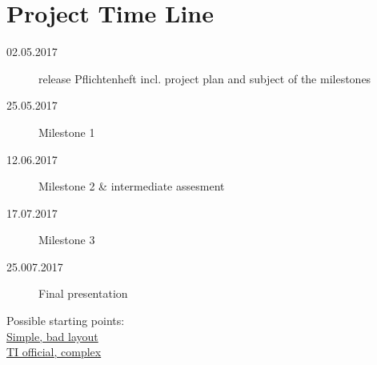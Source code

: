\section{Project Time Line}

\begin{description}
  \item[02.05.2017] release Pflichtenheft incl. project plan and subject of the milestones
  \item[25.05.2017] Milestone 1
  \item[12.06.2017] Milestone 2 \& intermediate assesment
  \item[17.07.2017] Milestone 3
  \item[25.007.2017] Final presentation
\end{description}

Possible starting points: \\
\href{https://bitbucket.org/StylingAndroid/bluetoothle/src/1fe191cf34f34f9917b1d0d62c617c607fe3df4d/src/main/java/com/stylingandroid/ble/?at=Part2}{Simple, bad layout} \\
\href{https://git.ti.com/sensortag-20-android/sensortag-20-android/trees/master/sensortag20/BleSensorTag/src/main/java/com/example/ti}{TI official, complex}
